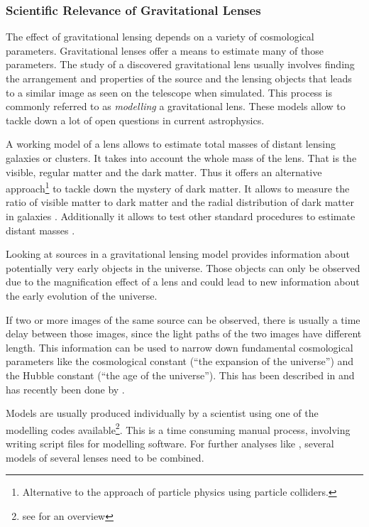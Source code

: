 \documentclass[11pt]{article}
\begin{document}
\subsubsection{Scientific Relevance of Gravitational Lenses}

The effect of gravitational lensing depends on a variety of cosmological parameters.
Gravitational lenses offer a means to estimate many of those parameters.
The study of a discovered gravitational lens usually involves finding the arrangement and properties of the source and the lensing objects that leads to a similar image as seen on the telescope when simulated.
This process is commonly referred to as \emph{modelling} a gravitational lens.
These models allow to tackle down a lot of open questions in current astrophysics.

A working model of a lens allows to estimate total masses of distant lensing galaxies or clusters.
It takes into account the whole mass of the lens.
That is the visible, regular matter and the dark matter\cite{kochanek1995there}.
Thus it offers an alternative approach\footnote{Alternative to the approach of particle physics using particle colliders.} to tackle down the mystery of dark matter.
It allows to measure the ratio of visible matter to dark matter and the radial distribution of dark matter in galaxies \cite{treukoop04}.
Additionally it allows to test other standard procedures to estimate distant masses \cite{kochanek1995there}.

Looking at sources in a gravitational lensing model provides information about potentially very early objects in the universe.
Those objects can only be observed due to the magnification effect of a lens and could lead to new information about the early evolution of the universe\cite{rusin03}.

If two or more images of the same source can be observed, there is usually a time delay between those images, since the light paths of the two images have different length.
This information can be used to narrow down fundamental cosmological parameters like the cosmological constant (``the expansion of the universe'') and the Hubble constant (``the age of the universe'').
This has been described in \cite{refsdal1964} and has recently been done by \cite{age_uni}.


Models are usually produced individually by a scientist using one of the modelling codes available\footnote{see \cite{overview_soft2013} for an overview}.
This is a time consuming manual process, involving writing script files for modelling software.
For further analyses like \cite{age_uni}, several models of several lenses need to be combined.
\end{document}
